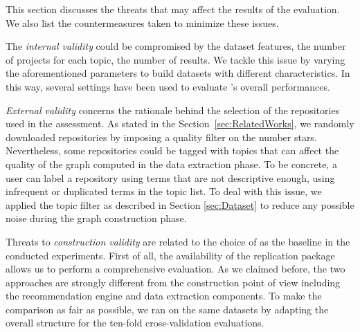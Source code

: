 
This section discusses the threats that may affect the results of the evaluation. We also list the countermeasures taken to minimize these issues.

The \emph{internal validity} could be compromised by the dataset features, \ie the number of projects for each topic, the number of results. We tackle this issue by varying the aforementioned parameters to build datasets with different characteristics. In this way, several settings have been used to evaluate \TF's overall performances.

\emph{External validity} concerns the rationale behind the selection of the \GH repositories used in the assessment. As stated in the Section~\ref{sec:RelatedWorks}, we randomly downloaded repositories by imposing a quality filter on the number stars. Nevertheless, some repositories could be tagged with topics that can affect the quality of the graph computed in the data extraction phase. To be concrete, a user can label a repository using terms that are not descriptive enough, \ie using infrequent or duplicated terms in the topic list. To deal with this issue, we applied the topic filter as described in Section \ref{sec:Dataset} to reduce any possible noise during the graph construction phase.

Threats to \emph{construction validity} are related to the choice of \MNB as the baseline in the conducted experiments. First of all, the availability of the replication package allows us to perform a comprehensive evaluation. %
As we claimed before, the two approaches are strongly different from the construction point of view including the recommendation engine and data extraction components. To make the comparison as fair as possible, we ran \MNB on the same datasets by adapting the overall structure for the ten-fold cross-validation evaluations.